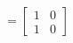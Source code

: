 \documentclass[preview]{standalone}
\begin{document}
\begin{align*}
= \begin{bmatrix} 1 &0 \\ 1 & 0\end{bmatrix}
\end{align*}
\end{document}
